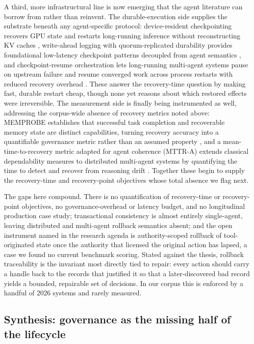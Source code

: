A third, more infrastructural line is now emerging that the agent literature can borrow from rather than reinvent. The durable-execution side supplies the substrate beneath any agent-specific protocol: device-resident checkpointing recovers GPU state and restarts long-running inference without reconstructing KV caches \citep{gan2026concordia}, write-ahead logging with quorum-replicated durability provides foundational low-latency checkpoint patterns decoupled from agent semantics \citep{kuschewski2026btrlog}, and checkpoint-resume orchestration lets long-running multi-agent systems pause on upstream failure and resume converged work across process restarts with reduced recovery overhead \citep{annapureddy2026prima}. These answer the recovery-time question by making fast, durable restart cheap, though none yet reasons about which restored effects were irreversible. The measurement side is finally being instrumented as well, addressing the corpus-wide absence of recovery metrics noted above: MEMPROBE establishes that successful task completion and recoverable memory state are distinct capabilities, turning recovery accuracy into a quantifiable governance metric rather than an assumed property \citep{ma2026memprobe}, and a mean-time-to-recovery metric adapted for agent coherence (MTTR-A) extends classical dependability measures to distributed multi-agent systems by quantifying the time to detect and recover from reasoning drift \citep{or2025mttralm}. Together these begin to supply the recovery-time and recovery-point objectives whose total absence we flag next.

The gaps here compound. There is no quantification of recovery-time or recovery-point objectives, no governance-overhead or latency budget, and no longitudinal production case study; transactional consistency is almost entirely single-agent, leaving distributed and multi-agent rollback semantics absent; and the open instrument named in the research agenda is authority-scoped rollback of tool-originated state once the authority that licensed the original action has lapsed, a case we found no current benchmark scoring. Stated against the thesis, rollback traceability is the invariant most directly tied to repair: every action should carry a handle back to the records that justified it so that a later-discovered bad record yields a bounded, repairable set of decisions. In our corpus this is enforced by a handful of 2026 systems and rarely measured.

\subsection{Synthesis: governance as the missing half of the lifecycle}

